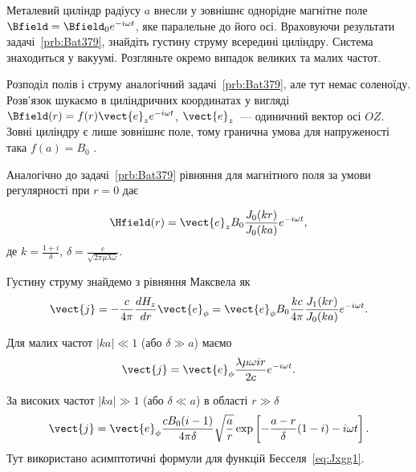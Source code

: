 	\begin{problem}%
	Металевий циліндр радіусу $a$ внесли у зовнішнє однорідне магнітне поле  $\Bfield = \Bfield_0e^{-i\omega t}$, яке паралельне до його осі. Враховуючи результати задачі~\ref{prb:Bat379}, знайдіть густину струму всередині циліндру. Система знаходиться у вакуумі. Розгляньте окремо випадок великих та малих частот.
	\begin{solution}
		Розподіл полів і струму аналогічний задачі~\ref{prb:Bat379}, але тут немає соленоїду. Розв’язок шукаємо в циліндричних координатах у вигляді  $\Bfield(r) = f(r)\vect{e}_ze^{- i\omega t}$,  $\vect{e}_z$~--- одиничний вектор  осі $OZ$. Зовні циліндру є лише зовнішнє поле, тому  гранична умова для напруженості така $f(a) = B_0$ .

		Аналогічно до задачі~\ref{prb:Bat379} рівняння для магнітного поля за умови регулярності при $r = 0$ дає

		\[
			\Hfield(r) = \vect{e}_z{B_0}\frac{{{J_0}(kr)}}{{{J_0}(ka)}} e^{ - i\omega t},
		\]
		де $ k = \frac{1 + i}{\delta}$, $\delta = \frac{c}{\sqrt {2\pi \mu \lambda \omega}}$.

		Густину струму знайдемо з рівняння Максвела як
		\[
			\vect{j}=  - \frac{c}{4\pi}\frac{dH_z}{dr}\vect{e}_\phi = \vect{e}_\phi B_0\frac{kc}{4\pi }\frac{J_1(kr)}{J_0(ka)}e^{ - i\omega t}.
		\]

		Для малих частот $|ka| \ll 1$ (або $\delta \gg a$) маємо
		\[
			\vect{j} = \vect{e}_\phi\frac{\lambda \mu \omega ir}{{2c}}e^{ - i\omega t}.
		\]

		За високих частот $|ka| \gg 1$ (або $\delta \ll a$) в області $r \gg \delta$
		\[
			\vect{j}=  \vect{e}_\phi\frac{{c{B_0}(i - 1)}}{{4\pi \delta }}\sqrt {\frac{a}{r}} \exp \left[ { - \frac{{a - r}}{\delta }(1 - i) - i\omega t} \right].
		\]
		Тут використано асимптотичні формули для функцій Бесселя~\eqref{eq:Jxgg1}.

	\end{solution}
	\end{problem}

